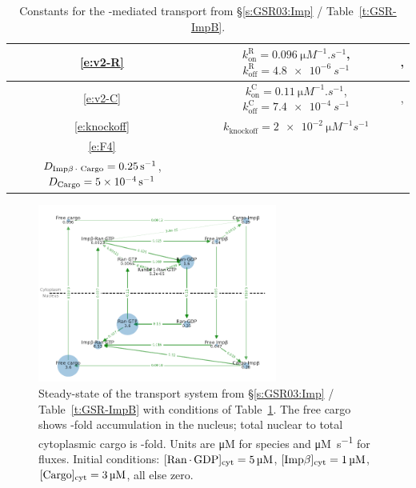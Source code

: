 \documentclass[12pt,notitlepage]{article}
\begin{document}
\begin{table}
\centering
\small
\begin{tabular}{c|c|c}
	\hline
	\eqref{e:v2-R}
	&
	$k_\text{on}^\text{R} = \SI{0.096}{\micro M^{-1} . s^{-1}}$,
	\;
	$k_\text{off}^\text{R} = \SI{4.8e-6}{s^{-1}}$
	&
	\cite[Supp.~Table~A]{GoerlichSeewaldRibbeck2003},
	\cite[Table II]{RiddickMacara2005}
	\\
	\hline
	\eqref{e:v2-C}
	&
	$k_\text{on}^\text{C} = \SI{0.11}{\micro M^{-1} . s^{-1}}$,
	\quad
	$k_\text{off}^\text{C} = \SI{7.4e-4}{s^{-1}}$
	&
	\cite[Table~I]{Catimel2001},
	\cite[Table~II]{RiddickMacara2005}
	\\
	\hline
	\eqref{e:knockoff}
	&
	$k_\text{knockoff} = \SI{2e-2}{\micro M^{-1} s^{-1}}$
	&
	\cite[Table II]{RiddickMacara2005}
	\\
	\hline
	\eqref{e:F4}
	&
	\makecell{
		$D_{\ce{Imp\beta . Ran . GTP}} = \SI{0.07}{s^{-1}}$, \quad
		$D_{\ce{Imp\beta}} = \SI{0.4}{s^{-1}}$
		\\
		$D_{\ce{Imp\beta . Cargo}} = \SI{0.25}{s^{-1}}$, \;	
		$D_{\ce{Cargo}} = \SI{5e-4}{s^{-1}}$
	}
	&
	\cite[Table III]{RiddickMacara2005}
	\\
	\hline
\end{tabular}
%
\caption{%
	Constants for the -mediated
	transport from \S\ref{s:GSR03:Imp} / Table~\ref{t:GSR-ImpB}.
}
%
\label{t:GSR-ImpB-const}
\end{table}



\begin{figure}
\centering
\includegraphics[width=0.7\textwidth]{20210225-GSR/v2/python/b_graph1/onion}
\caption{%
	Steady-state of 
	the transport system from 
	\S\ref{s:GSR03:Imp} / Table~\ref{t:GSR-ImpB}
	with conditions 
	of Table~\ref{t:GSR-ImpB-const}.
	The free cargo
	shows 
	\protect\unskip
	-fold accumulation
	in the nucleus;
	total nuclear to total cytoplasmic cargo
	is
	\protect\unskip
	-fold.
	Units are \si{\micro M} for species
	and \si{\micro M . s^{-1}} for fluxes.
	Initial conditions:
	$[\ce{Ran . GDP}]_\text{cyt} = \SI{5}{\micro M}$,
	$[\ce{Imp$\beta$}]_\text{cyt} = \SI{1}{\micro M}$,
	$[\ce{Cargo}]_\text{cyt} = \SI{3}{\micro M}$,
	all else zero.
}
\label{f:GSR-v2}
\end{figure}
\end{document}
